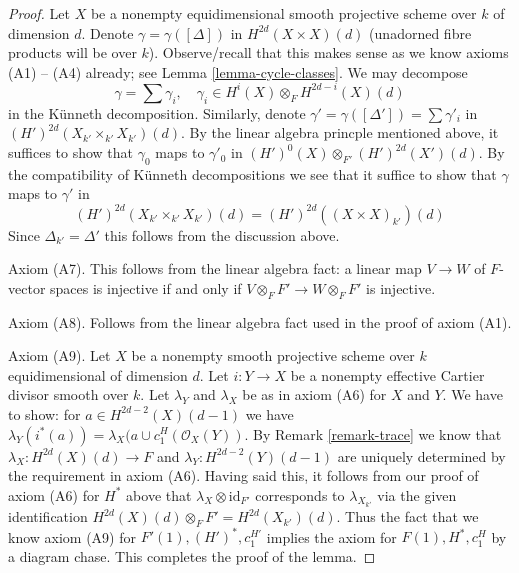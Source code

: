 \documentclass{stacks-project}
\theoremstyle{plain}
\theoremstyle{definition}
\theoremstyle{remark}
\numberwithin{equation}{subsection}
\begin{document}
\begin{proof}
\medskip\noindent
Let $X$ be a nonempty equidimensional smooth projective scheme
over $k$ of dimension $d$. Denote $\gamma = \gamma([\Delta])$
in $H^{2d}(X \times X)(d)$ (unadorned fibre products will be over $k$).
Observe/recall that this makes sense as we know axioms (A1) -- (A4) already;
see Lemma \ref{lemma-cycle-classes}. We may decompose
$$
\gamma = \sum \gamma_i, \quad
\gamma_i \in H^i(X) \otimes_F H^{2d - i}(X)(d)
$$
in the K\"unneth decomposition. Similarly, denote
$\gamma' = \gamma([\Delta']) = \sum \gamma'_i$
in $(H')^{2d}(X_{k'} \times_{k'} X_{k'})(d)$.
By the linear algebra princple mentioned above, it suffices
to show that $\gamma_0$ maps to $\gamma'_0$ in
$(H')^0(X) \otimes_{F'} (H')^{2d}(X')(d)$.
By the compatibility of K\"unneth decompositions
we see that it suffice to show that $\gamma$ maps to
$\gamma'$ in
$$
(H')^{2d}(X_{k'} \times_{k'} X_{k'})(d) = (H')^{2d}((X \times X)_{k'})(d)
$$
Since $\Delta_{k'} = \Delta'$ this follows from the discussion above.

\medskip\noindent
Axiom (A7). This follows from the linear algebra fact: a
linear map $V \to W$ of $F$-vector spaces is injective
if and only if $V \otimes_F F' \to W \otimes_F F'$ is injective.

\medskip\noindent
Axiom (A8). Follows from the linear algebra fact used in
the proof of axiom (A1).

\medskip\noindent
Axiom (A9). Let $X$ be a nonempty smooth projective scheme over $k$
equidimensional of dimension $d$. Let $i : Y \to X$ be a nonempty
effective Cartier divisor smooth over $k$.
Let $\lambda_Y$ and $\lambda_X$ be as in axiom (A6) for $X$ and $Y$.
We have to show: for $a \in H^{2d - 2}(X)(d - 1)$
we have $\lambda_Y(i^*(a)) = \lambda_X(a \cup c_1^H(\mathcal{O}_X(Y))$.
By Remark \ref{remark-trace}
we know that $\lambda_X : H^{2d}(X)(d) \to F$ and
$\lambda_Y : H^{2d - 2}(Y)(d - 1)$ are uniquely
determined by the requirement in axiom (A6).
Having said this, it follows from our proof of axiom (A6) for $H^*$ above
that $\lambda_X \otimes \text{id}_{F'}$ corresponds to $\lambda_{X_{k'}}$
via the given identification $H^{2d}(X)(d) \otimes_F F' = H^{2d}(X_{k'})(d)$.
Thus the fact that we know axiom (A9) for $F'(1), (H')^*, c_1^{H'}$
implies the axiom for $F(1), H^*, c_1^H$ by a diagram chase.
This completes the proof of the lemma.
\end{proof}



















\end{document}
